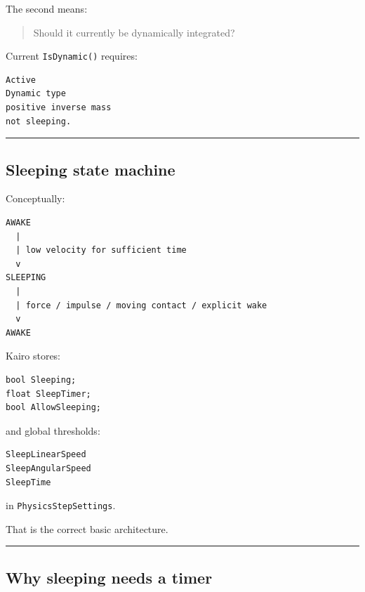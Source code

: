 The second means:

\begin{quote}
Should it currently be dynamically integrated?
\end{quote}

Current \texttt{IsDynamic()} requires:

\begin{verbatim}
Active
Dynamic type
positive inverse mass
not sleeping.
\end{verbatim}

\begin{center}\rule{0.5\linewidth}{0.5pt}\end{center}

\subsection{Sleeping state machine}\label{06-engine-ii-ch037-sleeping-state-machine}

\hypertarget{06-engine-ii-ch037-sleeping-state-machine}{}

Conceptually:

\begin{verbatim}
AWAKE
  |
  | low velocity for sufficient time
  v
SLEEPING
  |
  | force / impulse / moving contact / explicit wake
  v
AWAKE
\end{verbatim}

Kairo stores:

\begin{verbatim}
bool Sleeping;
float SleepTimer;
bool AllowSleeping;
\end{verbatim}

and global thresholds:

\begin{verbatim}
SleepLinearSpeed
SleepAngularSpeed
SleepTime
\end{verbatim}

in \texttt{PhysicsStepSettings}.

That is the correct basic architecture.

\begin{center}\rule{0.5\linewidth}{0.5pt}\end{center}

\subsection{Why sleeping needs a timer}\label{06-engine-ii-ch037-why-sleeping-needs-a-timer}

\hypertarget{06-engine-ii-ch037-why-sleeping-needs-a-timer}{}

